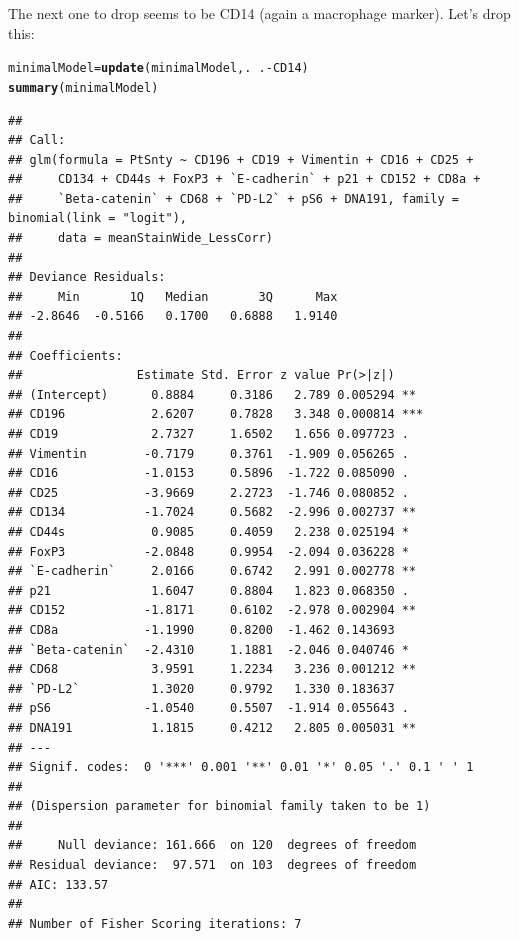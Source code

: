 \documentclass[a4paper]{article}\usepackage[]{graphicx}\usepackage[]{color}
\makeatletter
\newcommand{\hlopt}[1]{\textcolor[rgb]{0,0,0}{#1}}%
\newcommand{\hlstd}[1]{\textcolor[rgb]{0.345,0.345,0.345}{#1}}%
\newcommand{\hlkwb}[1]{\textcolor[rgb]{0.69,0.353,0.396}{#1}}%
\newcommand{\hlkwd}[1]{\textcolor[rgb]{0.737,0.353,0.396}{\textbf{#1}}}%
\newenvironment{kframe}{%
 \def\at@end@of@kframe{}%
 \ifinner\ifhmode%
  \def\at@end@of@kframe{\end{minipage}}%
  \begin{minipage}{\columnwidth}%
 \fi\fi%
 \def\FrameCommand##1{\hskip\@totalleftmargin \hskip-\fboxsep
 \colorbox{shadecolor}{##1}\hskip-\fboxsep
     \hskip-\linewidth \hskip-\@totalleftmargin \hskip\columnwidth}%
 \MakeFramed {\advance\hsize-\width
   \@totalleftmargin\z@ \linewidth\hsize
   \@setminipage}}%
 {\par\unskip\endMakeFramed%
 \at@end@of@kframe}
\newenvironment{knitrout}{}{} %
\makeatother
\begin{document}
The next one to drop seems to be CD14 (again a macrophage marker). Let's drop this:
\begin{knitrout}
\color{fgcolor}\begin{kframe}
\begin{alltt}
\hlstd{minimalModel} \hlkwb{=} \hlkwd{update}\hlstd{(minimalModel,.}\hlopt{~}\hlstd{.}\hlopt{-}\hlstd{CD14)}
\hlkwd{summary}\hlstd{(minimalModel)}
\end{alltt}
\begin{verbatim}
## 
## Call:
## glm(formula = PtSnty ~ CD196 + CD19 + Vimentin + CD16 + CD25 + 
##     CD134 + CD44s + FoxP3 + `E-cadherin` + p21 + CD152 + CD8a + 
##     `Beta-catenin` + CD68 + `PD-L2` + pS6 + DNA191, family = binomial(link = "logit"), 
##     data = meanStainWide_LessCorr)
## 
## Deviance Residuals: 
##     Min       1Q   Median       3Q      Max  
## -2.8646  -0.5166   0.1700   0.6888   1.9140  
## 
## Coefficients:
##                Estimate Std. Error z value Pr(>|z|)    
## (Intercept)      0.8884     0.3186   2.789 0.005294 ** 
## CD196            2.6207     0.7828   3.348 0.000814 ***
## CD19             2.7327     1.6502   1.656 0.097723 .  
## Vimentin        -0.7179     0.3761  -1.909 0.056265 .  
## CD16            -1.0153     0.5896  -1.722 0.085090 .  
## CD25            -3.9669     2.2723  -1.746 0.080852 .  
## CD134           -1.7024     0.5682  -2.996 0.002737 ** 
## CD44s            0.9085     0.4059   2.238 0.025194 *  
## FoxP3           -2.0848     0.9954  -2.094 0.036228 *  
## `E-cadherin`     2.0166     0.6742   2.991 0.002778 ** 
## p21              1.6047     0.8804   1.823 0.068350 .  
## CD152           -1.8171     0.6102  -2.978 0.002904 ** 
## CD8a            -1.1990     0.8200  -1.462 0.143693    
## `Beta-catenin`  -2.4310     1.1881  -2.046 0.040746 *  
## CD68             3.9591     1.2234   3.236 0.001212 ** 
## `PD-L2`          1.3020     0.9792   1.330 0.183637    
## pS6             -1.0540     0.5507  -1.914 0.055643 .  
## DNA191           1.1815     0.4212   2.805 0.005031 ** 
## ---
## Signif. codes:  0 '***' 0.001 '**' 0.01 '*' 0.05 '.' 0.1 ' ' 1
## 
## (Dispersion parameter for binomial family taken to be 1)
## 
##     Null deviance: 161.666  on 120  degrees of freedom
## Residual deviance:  97.571  on 103  degrees of freedom
## AIC: 133.57
## 
## Number of Fisher Scoring iterations: 7
\end{verbatim}
\end{kframe}
\end{knitrout}
\end{document}

